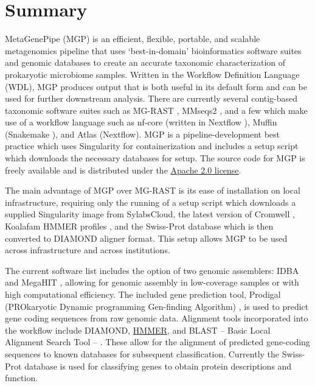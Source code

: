\hypertarget{summary}{%
\section{Summary}\label{summary}}

MetaGenePipe (MGP) is an efficient, flexible, portable, and scalable
metagenomics pipeline that uses `best-in-domain' bioinformatics software
suites and genomic databases to create an accurate taxonomic
characterization of prokaryotic microbiome samples. Written in the
Workflow Definition Language (WDL), MGP produces output that is both
useful in its default form and can be used for further downstream
analysis. There are currently several contig-based taxonomic software
suites such as MG-RAST \autocite{keegan_glass_meyer_2016}, MMseqs2
\autocite{10.1093/bioinformatics/btab184}, and a few which make use of a
workflow language such as nf-core
\autocite{krakau_straub_gourlé_gabernet_nahnsen_2021} (written in
Nextflow
\autocite{di_tommaso_chatzou_floden_barja_palumbo_notredame_2017}),
Muffin
\autocite{van_damme_hölzer_viehweger_müller_bongcam-rudloff_brandt_2021}
(Snakemake
\autocite{mölder_jablonski_letcher_hall_tomkins-tinch_sochat_forster_lee_twardziok_kanitz_et_al._2021}),
and Atlas \autocite{kieser_brown_zdobnov_trajkovski_mccue_2020}
(Nextflow). MGP is a pipeline-development best practice which uses
Singularity \autocite{kurtzer_sochat_bauer_2017} for containerization
and includes a setup script which downloads the necessary databases for
setup. The source code for MGP is freely available and is distributed
under the \href{https://www.apache.org/licenses/LICENSE-2.0}{Apache 2.0
license}.

The main advantage of MGP over MG-RAST is its ease of installation on
local infrastructure, requiring only the running of a setup script which
downloads a supplied Singularity image from SylabsCloud, the latest
version of Cromwell \autocite{voss_van_der_auwera_gentry_2022}, Koalafam
HMMER profiles
\autocite{aramaki_blanc-mathieu_endo_ohkubo_kanehisa_goto_ogata_2019},
and the Swiss-Prot database \autocite{uniprot_consortium_2018} which is
then converted to DIAMOND aligner \autocite{Buchfink2015-rn} format.
This setup allows MGP to be used across infrastructure and across
institutions.

The current software list includes the option of two genomic assemblers:
IDBA \autocite{peng_leung_yiu_chin_2012} and MegaHIT
\autocite{li_liu_luo_sadakane_lam_2015}, allowing for genomic assembly
in low-coverage samples or with high computational efficiency. The
included gene prediction tool, Prodigal (PROkaryotic Dynamic programming
Gen-finding Algorithm)
\autocite{hyatt_chen_locascio_land_larimer_hauser_2010}, is used to
predict gene coding sequences from raw genomic data. Alignment tools
incorporated into the workflow include DIAMOND,
\href{http://hmmer.org/}{HMMER}, and BLAST -- Basic Local Alignment
Search Tool --
\autocite{Camacho2009-hf,Altschul1990-xn,Altschul1997-oe}. These allow
for the alignment of predicted gene-coding sequences to known databases
for subsequent classification. Currently the Swiss-Prot database is used
for classifying genes to obtain protein descriptions and function.

